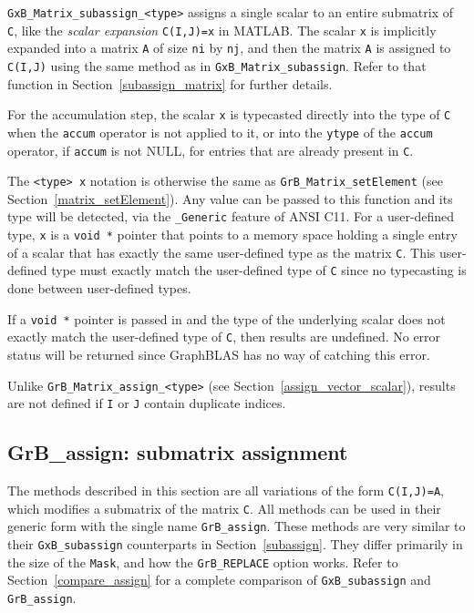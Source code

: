 \documentclass[12pt]{article}
\begin{document}
\verb'GxB_Matrix_subassign_<type>' assigns a single scalar to an entire
submatrix of \verb'C', like the {\em scalar expansion} \verb'C(I,J)=x' in
MATLAB.  The scalar \verb'x' is implicitly expanded into a matrix \verb'A' of
size \verb'ni' by \verb'nj', and then the matrix \verb'A' is assigned to
\verb'C(I,J)' using the same method as in \verb'GxB_Matrix_subassign'.  Refer
to that function in Section~\ref{subassign_matrix} for further details.

For the accumulation step, the scalar \verb'x' is typecasted directly into the
type of \verb'C' when the \verb'accum' operator is not applied to it, or into
the \verb'ytype' of the \verb'accum' operator, if \verb'accum' is not NULL, for
entries that are already present in \verb'C'.

The \verb'<type> x' notation is otherwise the same as
\verb'GrB_Matrix_setElement' (see Section~\ref{matrix_setElement}).  Any value
can be passed to this function and its type will be detected, via the
\verb'_Generic' feature of ANSI C11.  For a user-defined type, \verb'x' is a
\verb'void *' pointer that points to a memory space holding a single entry of a
scalar that has exactly the same user-defined type as the matrix \verb'C'.
This user-defined type must exactly match the user-defined type of \verb'C'
since no typecasting is done between user-defined types.

If a \verb'void *' pointer is passed in and the type of the underlying scalar
does not exactly match the user-defined type of \verb'C', then results are
undefined.  No error status will be returned since GraphBLAS has no way of
catching this error.

Unlike \verb'GrB_Matrix_assign_<type>' (see
Section~\ref{assign_vector_scalar}), results are not defined if \verb'I' or
\verb'J' contain duplicate indices.

\newpage
\subsection{{\sf GrB\_assign:} submatrix assignment} %
\label{assign}

The methods described in this section are all variations of the form
\verb'C(I,J)=A', which modifies a submatrix of the matrix \verb'C'.  All
methods can be used in their generic form with the single name
\verb'GrB_assign'.  These methods are very similar to their
\verb'GxB_subassign' counterparts in Section~\ref{subassign}.  They differ
primarily in the size of the \verb'Mask', and how the \verb'GrB_REPLACE' option
works.  Refer to Section~\ref{compare_assign} for a complete comparison of
\verb'GxB_subassign' and \verb'GrB_assign'.
\end{document}
